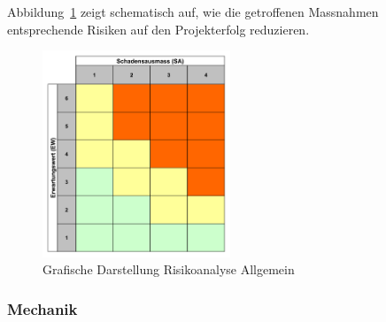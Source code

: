 \documentclass[main.tex]{subfiles} %
\begin{document}
Abbildung~\ref{fig:Diagramm_Risiko_allg} zeigt schematisch auf, wie die
getroffenen Massnahmen entsprechende Risiken auf den Projekterfolg reduzieren.

\begin{figure}[h]
    \centering
    \includegraphics[width=0.5\textwidth]{./Risks_Diagramm/Diagramm_Risiko_allg.pdf}
    \caption{Grafische Darstellung Risikoanalyse Allgemein}
    \label{fig:Diagramm_Risiko_allg}
\end{figure}


\subsubsection*{Mechanik}
\end{document}

